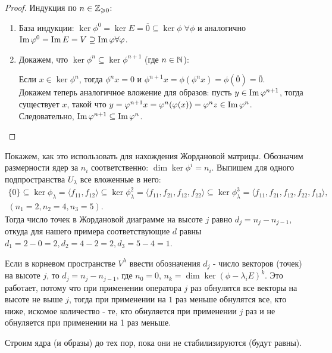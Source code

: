 \begin{proof}
    Индукция по $n \in \mathbb{Z}_{\geqslant 0}$:

    \begin{enumerate}
        \item База индукции: $\ker \phi^0 = \ker E = {\overline{0}} \subseteq \ker \phi \; \forall \phi$ и аналогично $\operatorname{Im} \varphi^0 = \operatorname{Im} E = V \supseteq \operatorname{Im} \varphi \forall \varphi$.
        \item Докажем, что $\ker \phi^n \subseteq \ker \phi^{n+1}$ (где $n \in \mathbb{N}$):
        
        Если $x \in \ker \phi^n$, тогда $\phi^n x = 0$ и $\phi ^{n + 1} x = \phi (\phi ^ n x) = \phi (\overline{0}) = \overline{0}$. \\
        Докажем теперь аналогичное вложение для образов: пусть $y \in \operatorname{Im} \varphi^{n + 1}$, тогда существует $x$, такой что $y = \varphi^{n + 1} x = \varphi^n(\varphi(x)) = \varphi^n z \in \operatorname{Im} \varphi^n$. Следовательно, $\operatorname{Im} \varphi^{n + 1} \subseteq \operatorname{Im} \varphi^n$.
    \end{enumerate}
\end{proof}

\begin{algorithm}

Покажем, как это использовать для нахождения Жордановой матрицы. Обозначим размерности ядер за $n_i$ соответственно: $\dim \ker \phi^i = n_i$. Выпишем для одного подпространства $U_{\lambda}$ все вложенные в него:
\begin{eqnarray}  
    \{0\} \subseteq \ker \phi_{\lambda} = \langle f_{11}, f_{12}\rangle \subseteq \ker \phi_{\lambda}^2 
    = \langle f_{11}, f_{21}, f_{12}, f_{22} \rangle \subseteq \ker \phi_{\lambda}^3 = 
    \langle f_{11}, f_{21}, f_{12}, f_{22}, f_{13} \rangle, \\ (n_1 = 2, n_2 = 4, n_3 = 5).
\end{eqnarray}
Тогда число точек в Жордановой диаграмме на высоте $j$ равно $d_j = n_j - n_{j-1}$, откуда для нашего примера соответствующие $d$ равны $d_1 = 2-0=2, d_2 = 4-2=2, d_3 = 5-4=1$.

Если в корневом пространстве $V^{\lambda}$ ввести обозначения $d_j$ - число векторов (точек) на высоте $j$, то $d_j = n_j - n_{j-1}$, где $n_0 = 0$, $n_k = \dim \ker (\phi - \lambda_i E)^k$.
Это работает, потому что при применении оператора $j$ раз обнулятся все векторы на высоте не выше $j$, 
тогда при применении на $1$ раз меньше обнулятся все, кто ниже, искомое количество - те, кто обнуляется при применении $j$ раз и не обнуляется при применении на 1 раз меньше.

Строим ядра (и образы) до тех пор, пока они не стабилизируются (будут равны).
\end{algorithm}

